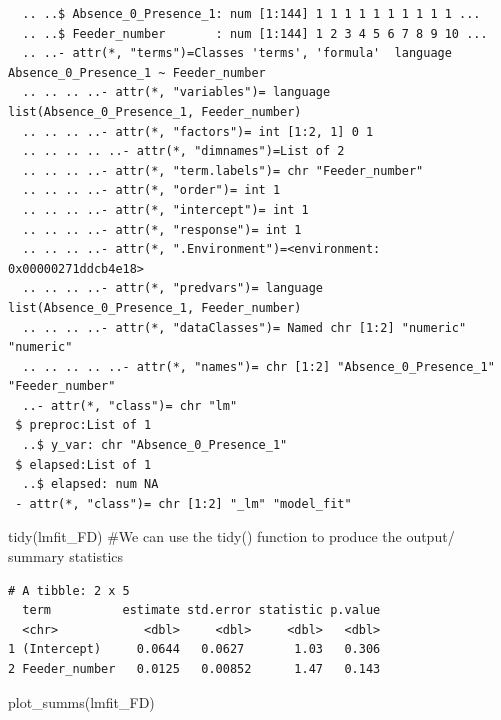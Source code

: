 \documentclass[
  letterpaper,
  DIV=11,
  numbers=noendperiod]{scrartcl}
\newenvironment{Shaded}{}{}
\newcommand{\CommentTok}[1]{\textcolor[rgb]{0.42,0.45,0.49}{#1}}
\newcommand{\FunctionTok}[1]{\textcolor[rgb]{0.44,0.26,0.76}{#1}}
\newcommand{\NormalTok}[1]{\textcolor[rgb]{0.14,0.16,0.18}{#1}}
\begin{document}
\begin{verbatim}
  .. ..$ Absence_0_Presence_1: num [1:144] 1 1 1 1 1 1 1 1 1 1 ...
  .. ..$ Feeder_number       : num [1:144] 1 2 3 4 5 6 7 8 9 10 ...
  .. ..- attr(*, "terms")=Classes 'terms', 'formula'  language Absence_0_Presence_1 ~ Feeder_number
  .. .. .. ..- attr(*, "variables")= language list(Absence_0_Presence_1, Feeder_number)
  .. .. .. ..- attr(*, "factors")= int [1:2, 1] 0 1
  .. .. .. .. ..- attr(*, "dimnames")=List of 2
  .. .. .. ..- attr(*, "term.labels")= chr "Feeder_number"
  .. .. .. ..- attr(*, "order")= int 1
  .. .. .. ..- attr(*, "intercept")= int 1
  .. .. .. ..- attr(*, "response")= int 1
  .. .. .. ..- attr(*, ".Environment")=<environment: 0x00000271ddcb4e18> 
  .. .. .. ..- attr(*, "predvars")= language list(Absence_0_Presence_1, Feeder_number)
  .. .. .. ..- attr(*, "dataClasses")= Named chr [1:2] "numeric" "numeric"
  .. .. .. .. ..- attr(*, "names")= chr [1:2] "Absence_0_Presence_1" "Feeder_number"
  ..- attr(*, "class")= chr "lm"
 $ preproc:List of 1
  ..$ y_var: chr "Absence_0_Presence_1"
 $ elapsed:List of 1
  ..$ elapsed: num NA
 - attr(*, "class")= chr [1:2] "_lm" "model_fit"
\end{verbatim}

\begin{Shaded}
\begin{Highlighting}[]
\FunctionTok{tidy}\NormalTok{(lmfit\_FD) }\CommentTok{\#We can use the tidy() function to produce the output/ summary statistics}
\end{Highlighting}
\end{Shaded}

\begin{verbatim}
# A tibble: 2 x 5
  term          estimate std.error statistic p.value
  <chr>            <dbl>     <dbl>     <dbl>   <dbl>
1 (Intercept)     0.0644   0.0627       1.03   0.306
2 Feeder_number   0.0125   0.00852      1.47   0.143
\end{verbatim}

\begin{Shaded}
\begin{Highlighting}[]
\FunctionTok{plot\_summs}\NormalTok{(lmfit\_FD)}
\end{Highlighting}
\end{Shaded}
\end{document}
